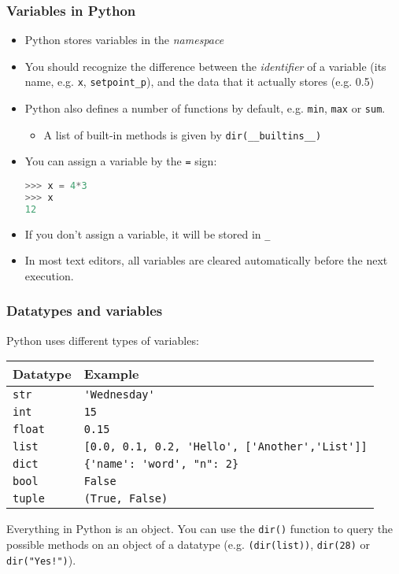 \begin{frame}[fragile]
 \frametitle{Variables in Python}
  \begin{itemize}
    \item Python stores variables in the \emph{namespace}\pause
    \item You should recognize the difference between the \emph{identifier} of a variable (its name, e.g. \lstinline$x$, \lstinline$setpoint_p$), and the data that it actually stores (e.g. 0.5)\pause
    \item Python also defines a number of functions by default, e.g. \lstinline$min$, \lstinline$max$ or \lstinline$sum$.
    \begin{itemize}
      \item A list of built-in methods is given by \lstinline$dir(__builtins__)$
    \end{itemize}
    \pause
    \item You can assign a variable by the \lstinline$=$ sign:
   \begin{lstlisting}[language=Python, numbers=none]
>>> x = 4*3
>>> x
12
   \end{lstlisting}\pause
   \item If you don't assign a variable, it will be stored in \lstinline$_$
   \item In most text editors, all variables are cleared automatically before the next execution. 
 \end{itemize}
\end{frame}

\begin{frame}[fragile]
  \frametitle{Datatypes and variables}
  Python uses different types of variables:
      \begin{longtable}{l!{\vrule}l}
       Datatype        & Example \\ \hline
       \lstinline$str$    & \lstinline$'Wednesday'$ \\
       \lstinline$int$    & \lstinline$15$ \\
       \lstinline$float$  & \lstinline$0.15$ \\
       \lstinline$list$   & \lstinline$[0.0, 0.1, 0.2, 'Hello', ['Another','List']]$ \\
       \lstinline$dict$   & \lstinline${'name': 'word', "n": 2}$ \\
       \lstinline$bool$   & \lstinline$False$ \\
       \lstinline$tuple$  & \lstinline$(True, False)$ \\
     \end{longtable}
     \pause
     Everything in Python is an object. You can use the \lstinline$dir()$ function to query the possible methods on an object of a datatype (e.g. \lstinline$(dir(list))$, \lstinline$dir(28)$ or \lstinline$dir("Yes!")$).
 \end{frame}

